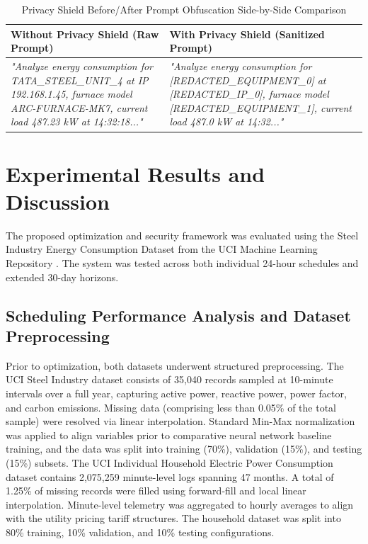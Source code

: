 \documentclass[journal]{IEEEtran}
\begin{document}
\begin{table}[htbp]
\centering
\caption{Privacy Shield Before/After Prompt Obfuscation Side-by-Side Comparison}
\label{tab:prompt_comparison}
\begin{tabular}{p{} p{}}
\toprule
\textbf{Without Privacy Shield (Raw Prompt)} & \textbf{With Privacy Shield (Sanitized Prompt)} \\
\midrule
\textit{"Analyze energy consumption for TATA\_STEEL\_UNIT\_4 at IP 192.168.1.45, furnace model ARC-FURNACE-MK7, current load 487.23 kW at 14:32:18..."} & \textit{"Analyze energy consumption for [REDACTED\_EQUIPMENT\_0] at [REDACTED\_IP\_0], furnace model [REDACTED\_EQUIPMENT\_1], current load 487.0 kW at 14:32..."} \\
\bottomrule
\end{tabular}
\end{table}

\section{Experimental Results and Discussion}
The proposed optimization and security framework was evaluated using the Steel Industry Energy Consumption Dataset from the UCI Machine Learning Repository \cite{ref20}. The system was tested across both individual 24-hour schedules and extended 30-day horizons.

\subsection{Scheduling Performance Analysis and Dataset Preprocessing}
Prior to optimization, both datasets underwent structured preprocessing. The UCI Steel Industry dataset consists of 35,040 records sampled at 10-minute intervals over a full year, capturing active power, reactive power, power factor, and carbon emissions. Missing data (comprising less than 0.05\% of the total sample) were resolved via linear interpolation. Standard Min-Max normalization was applied to align variables prior to comparative neural network baseline training, and the data was split into training (70\%), validation (15\%), and testing (15\%) subsets. The UCI Individual Household Electric Power Consumption dataset contains 2,075,259 minute-level logs spanning 47 months. A total of 1.25\% of missing records were filled using forward-fill and local linear interpolation. Minute-level telemetry was aggregated to hourly averages to align with the utility pricing tariff structures. The household dataset was split into 80\% training, 10\% validation, and 10\% testing configurations.
\end{document}
